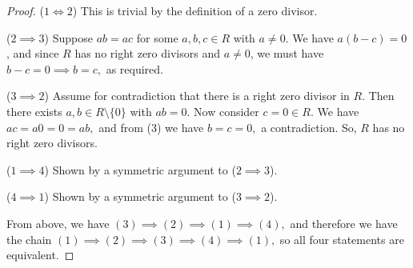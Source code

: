 \begin{proof}
  
  


  




($1 \iff 2$) This is trivial by the definition of a zero divisor.

($2 \implies 3$) Suppose $ab = ac$ for some $a,b,c \in R$ with $a \neq 0$. We have $a(b-c) = 0$, and since $R$ has no right zero divisors and $a \neq 0$, we must have $b-c = 0 \implies b = c,$ as required.

($3 \implies 2$) Assume for contradiction that there is a right zero divisor in $R$. Then there exists $a,b \in R \setminus \{0\}$ with $ab=0.$ Now consider $c=0\in R.$ We have $ac=a0=0=ab,$ and from (3) we have $b=c=0,$ a contradiction. So, $R$ has no right zero divisors.

($1 \implies 4$) Shown by a symmetric argument to ($2 \implies 3$).


($4 \implies 1$) Shown by a symmetric argument to ($3 \implies 2$).


From above, we have $(3) \implies (2) \implies (1) \implies (4),$ and therefore we have the chain $(1) \implies (2) \implies (3) \implies (4) \implies (1),$
so all four statements are equivalent.
\end{proof}

